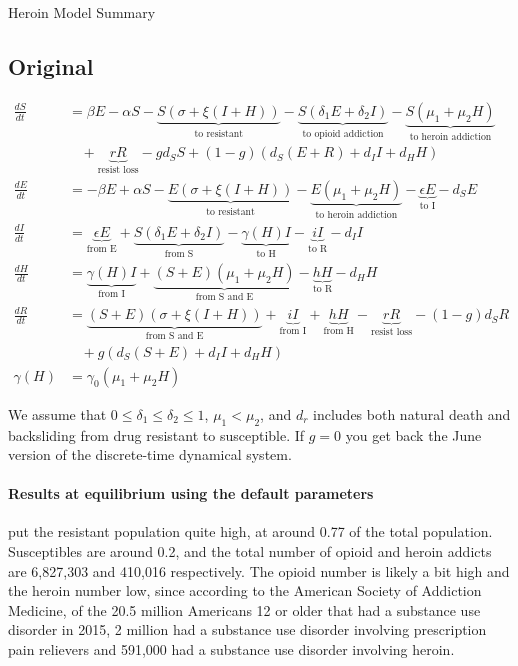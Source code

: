 \documentclass[11pt]{report}
\begin{document}
\begin{center}
{\Huge Heroin Model Summary}\\	
\end{center}
\vspace{1in}

\subsection*{Original}

\begin{align*}
	\frac{dS}{dt} &= \beta E - \alpha S - \underbrace{S(\sigma + \xi(I+H))}_{\text{to resistant}} - \underbrace{S(\delta_1 E + \delta_2 I)}_{\text{to opioid addiction}} - \underbrace{S(\mu_1+\mu_2H)}_{\text{to heroin addiction}}\\
	&\ \ \ \ + \underbrace{rR}_{\text{resist loss}} - gd_SS + (1-g)(d_S(E+R) + d_II + d_HH)\\
	\frac{dE}{dt} &= - \beta E + \alpha S - \underbrace{E(\sigma + \xi(I+H))}_{\text{to resistant}} - \underbrace{E(\mu_1 + \mu_2H)}_{\text{to heroin addiction}} - \underbrace{\epsilon E}_{\text{to I}} - d_S E\\
	\frac{dI}{dt} &= \underbrace{\epsilon E}_{\text{from E}} + \underbrace{S(\delta_1E+\delta_2I)}_{\text{from S}} - \underbrace{\gamma(H)I}_{\text{to H}} - \underbrace{iI}_{\text{to R}} - d_II\\
	\frac{dH}{dt} &= \underbrace{\gamma(H)I}_{\text{from I}} + \underbrace{(S+E)(\mu_1+\mu_2H)}_{\text{from S and E}} - \underbrace{hH}_{\text{to R}} - d_HH\\
	\frac{dR}{dt} &= \underbrace{(S+E)(\sigma + \xi(I+H))}_{\text{from S and E}} + \underbrace{iI}_{\text{from I}} + \underbrace{hH}_{\text{from H}} - 
	\underbrace{rR}_{\text{resist loss}} - (1-g)d_SR\\ 
	&\ \ \ \ + g(d_S(S+E) + d_II + d_HH)\\
	\gamma(H) &= \gamma_0(\mu_1+\mu_2H)
\end{align*}

We assume that $0\leq\delta_1\leq\delta_2\leq 1$, $\mu_1<\mu_2$, and $d_r$ includes both natural death and backsliding from drug resistant to susceptible. If $g=0$ you get back the June version of the discrete-time dynamical system.

\paragraph{Results at equilibrium using the default parameters} put the resistant population quite high, at around 0.77 of the total population. Susceptibles are around 0.2, and the total number of opioid and heroin addicts are 6,827,303 and 410,016 respectively. The opioid number is likely a bit high and the heroin number low, since according to the American Society of Addiction Medicine, of the 20.5 million Americans 12 or older that had a substance use disorder in 2015, 2 million had a substance use disorder involving prescription pain relievers and 591,000 had a substance use disorder involving heroin.
\end{document}
